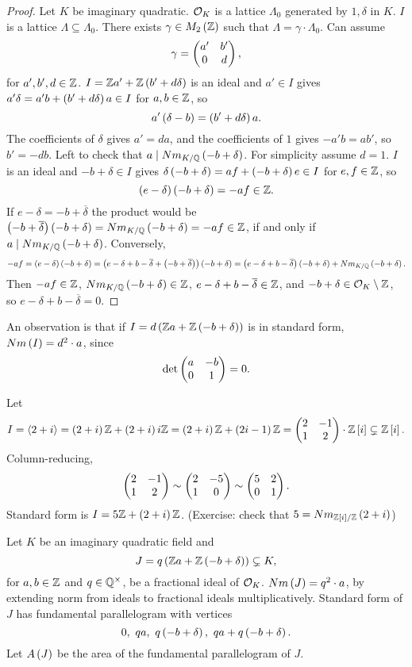 \begin{proof}
Let $ K $ be imaginary quadratic. $ \mathcal{O}_K $ is a lattice $ \Lambda_0 $ generated by $ 1, \delta $ in $ K $. $ I $ is a lattice $ \Lambda \subseteq \Lambda_0 $. There exists $ \gamma \in M_2\left( \mathbb{Z} \right) $ such that $ \Lambda = \gamma \cdot \Lambda_0 $. Can assume
$$ \gamma = \begin{pmatrix} a' & b' \\ 0 & d \end{pmatrix}, $$
for $ a', b', d \in \mathbb{Z} $. $ I = \mathbb{Z} a' + \mathbb{Z}\left( b' + d\delta \right) $ is an ideal and $ a' \in I $ gives $ a'\delta = a'b + \left( b' + d\delta \right)a \in I $ for $ a, b \in \mathbb{Z} $, so
$$ a'\left( \delta - b \right) = \left( b' + d\delta \right)a. $$
The coefficients of $ \delta $ gives $ a' = da $, and the coefficients of $ 1 $ gives $ -a'b = ab' $, so $ b' = -db $. Left to check that $ a \mid Nm_{K / \mathbb{Q}}\left( -b + \delta \right) $. For simplicity assume $ d = 1 $. $ I $ is an ideal and $ -b + \delta \in I $ gives $ \delta\left( -b + \delta \right) = af + \left( -b + \delta \right)e \in I $ for $ e, f \in \mathbb{Z} $, so
$$ \left( e - \delta \right)\left( -b + \delta \right) = -af \in \mathbb{Z}. $$
If $ e - \delta = -b + \overline{\delta} $ the product would be $ \left( -b + \overline{\delta} \right)\left( -b + \delta \right) = Nm_{K / \mathbb{Q}}\left( -b + \delta \right) = -af \in \mathbb{Z} $, if and only if $ a \mid Nm_{K / \mathbb{Q}}\left( -b + \delta \right) $. Conversely,
$$ -af = \left( e - \delta \right)\left( -b + \delta \right) = \left( e - \delta + b - \overline{\delta} + \left( -b + \overline{\delta} \right) \right)\left( -b + \delta \right) = \left( e - \delta + b - \overline{\delta} \right)\left( -b + \delta \right) + Nm_{K / \mathbb{Q}}\left( -b + \delta \right). $$
Then $ -af \in \mathbb{Z} $, $ Nm_{K / \mathbb{Q}}\left( -b + \delta \right) \in \mathbb{Z} $, $ e - \delta + b - \overline{\delta} \in \mathbb{Z} $, and $ -b + \delta \in \mathcal{O}_K \setminus \mathbb{Z} $, so $ e - \delta + b - \overline{\delta} = 0 $.
\end{proof}

An observation is that if $ I = d\left( \mathbb{Z} a + \mathbb{Z}\left( -b + \delta \right) \right) $ is in standard form, $ Nm\left( I \right) = d^2 \cdot a $, since
$$ \det\begin{pmatrix} a & -b \\ 0 & 1 \end{pmatrix} = 0. $$

\pagebreak


\begin{example*}
Let
$$ I = \left\langle 2 + i \right\rangle = \left( 2 + i \right)\mathbb{Z} + \left( 2 + i \right)i\mathbb{Z} = \left( 2 + i \right)\mathbb{Z} + \left( 2i - 1 \right)\mathbb{Z} = \begin{pmatrix} 2 & -1 \\ 1 & 2 \end{pmatrix} \cdot \mathbb{Z}\left[ i \right] \subsetneq \mathbb{Z}\left[ i \right]. $$
Column-reducing,
$$ \begin{pmatrix} 2 & -1 \\ 1 & 2 \end{pmatrix} \sim \begin{pmatrix} 2 & -5 \\ 1 & 0 \end{pmatrix} \sim \begin{pmatrix} 5 & 2 \\ 0 & 1 \end{pmatrix}. $$
Standard form is $ I = 5\mathbb{Z} + \left( 2 + i \right)\mathbb{Z} $. (Exercise: check that $ 5 = Nm_{\mathbb{Z}\left[ i \right] / \mathbb{Z}}\left( 2 + i \right) $)
\end{example*}

Let $ K $ be an imaginary quadratic field and
$$ J = q\left( \mathbb{Z} a + \mathbb{Z}\left( -b + \delta \right) \right) \subsetneq K, $$
for $ a, b \in \mathbb{Z} $ and $ q \in \mathbb{Q}^\times $, be a fractional ideal of $ \mathcal{O}_K $. $ Nm\left( J \right) = q^2 \cdot a $, by extending norm from ideals to fractional ideals multiplicatively. Standard form of $ J $ has fundamental parallelogram with vertices
$$ 0, \ qa, \ q\left( -b + \delta \right), \ qa + q\left( -b + \delta \right). $$
Let $ A\left( J \right) $ be the area of the fundamental parallelogram of $ J $.

